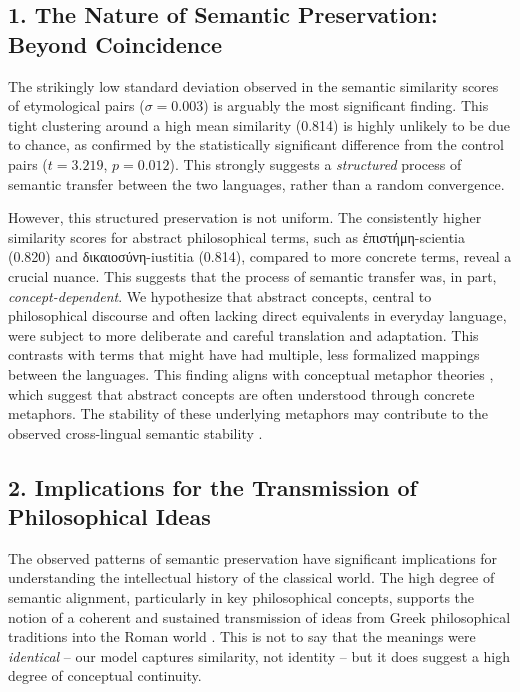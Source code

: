 \documentclass[11pt]{article} %
\begin{document}
\subsection*{1. The Nature of Semantic Preservation: Beyond Coincidence}

The strikingly low standard deviation observed in the semantic similarity scores of etymological pairs ($\sigma = 0.003$) is arguably the most significant finding. This tight clustering around a high mean similarity (0.814) is highly unlikely to be due to chance, as confirmed by the statistically significant difference from the control pairs ($t=3.219$, $p=0.012$). This strongly suggests a \textit{structured} process of semantic transfer between the two languages, rather than a random convergence.

However, this structured preservation is not uniform.  The consistently higher similarity scores for abstract philosophical terms, such as \textgreek{ἐπιστήμη}-scientia (0.820) and \textgreek{δικαιοσύνη}-iustitia (0.814), compared to more concrete terms, reveal a crucial nuance.  This suggests that the process of semantic transfer was, in part, \textit{concept-dependent}. We hypothesize that abstract concepts, central to philosophical discourse and often lacking direct equivalents in everyday language, were subject to more deliberate and careful translation and adaptation.  This contrasts with terms that might have had multiple, less formalized mappings between the languages. This finding aligns with conceptual metaphor theories \cite{lakoff1980metaphors}, which suggest that abstract concepts are often understood through concrete metaphors. The stability of these underlying metaphors may contribute to the observed cross-lingual semantic stability \cite{gaber2024proverbs}.

\subsection*{2. Implications for the Transmission of Philosophical Ideas}

The observed patterns of semantic preservation have significant implications for understanding the intellectual history of the classical world.  The high degree of semantic alignment, particularly in key philosophical concepts, supports the notion of a coherent and sustained transmission of ideas from Greek philosophical traditions into the Roman world \cite{slisli2024imitatio}.  This is not to say that the meanings were \textit{identical} – our model captures similarity, not identity – but it does suggest a high degree of conceptual continuity.
\end{document}
